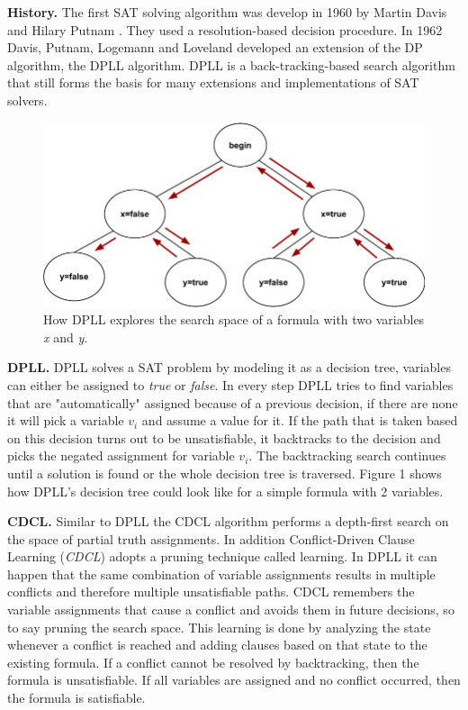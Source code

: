 \documentclass[letterpaper]{article}
\newcommand{\mypar}[1]{{\bf #1.}}
\begin{document}
\mypar{History}
The first SAT solving algorithm was develop in 1960 by Martin Davis and Hilary Putnam \cite{dp}.
They used a resolution-based decision procedure.
In 1962 Davis, Putnam, Logemann and Loveland developed an extension of the DP algorithm, the DPLL algorithm.
DPLL is a back-tracking-based search algorithm that still forms the basis for many extensions and implementations of SAT solvers.
\begin{figure}
	\centering
	\includegraphics[width=\columnwidth]{figures/dpll_branching.pdf}
	\caption{How DPLL explores the search space of a formula with two variables \textit{x} and \textit{y}.
		\label{fig:dpll-branching}}
\end{figure}

\mypar{DPLL}
DPLL solves a SAT problem by modeling it as a decision tree, variables can either be assigned to \textit{true} or \textit{false}.
In every step DPLL tries to find variables that are "automatically" assigned because of a previous decision,
if there are none it will pick a variable $v_i$ and assume a value for it.
If the path that is taken based on this decision turns out to be unsatisfiable, it backtracks to the decision and picks the negated assignment for variable $v_i$.
The backtracking search continues until a solution is found or the whole decision tree is traversed.
Figure 1 shows how DPLL's decision tree could look like for a simple formula with 2 variables.

\mypar{CDCL}
Similar to DPLL the CDCL algorithm performs a depth-first search on the space of partial truth assignments.
In addition Conflict-Driven Clause Learning (\textit{CDCL}) adopts a pruning technique called learning.
In DPLL it can happen that the same combination of variable assignments results in multiple conflicts and therefore multiple unsatisfiable paths.
CDCL remembers the variable assignments that cause a conflict and avoids them in future decisions, so to say pruning the search space.
This learning is done by analyzing the state whenever a conflict is reached and adding clauses based on that state to the existing formula.
If a conflict cannot be resolved by backtracking, then the formula is unsatisfiable.
If all variables are assigned and no conflict occurred, then the formula is satisfiable.
\end{document}
